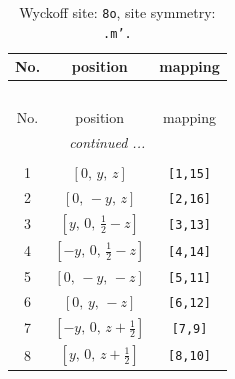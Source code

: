 \documentclass[fleqn,8pt]{jsarticle}
\begin{document}
\renewcommand{\arraystretch}{1.2}
\begin{longtable}{ccc}
\caption{Wyckoff site: {\tt 8o}, site symmetry: {\tt .m'.}}
 \\
 \hline \hline
No. & position & mapping \\ \hline \endfirsthead

\multicolumn{2}{l}{\tablename\ \thetable{}} \\
 \hline \hline
No. & position & mapping \\ \hline \endhead

 \hline \hline
\multicolumn{2}{r}{\footnotesize\it continued ...} \\ \endfoot

 \hline \hline
\multicolumn{2}{r}{} \\ \endlastfoot

1 & $\left[ 0,\, y,\, z \right]$ & {\tt [1,15]} \\ \hline
2 & $\left[ 0,\, - y,\, z \right]$ & {\tt [2,16]} \\ \hline
3 & $\left[ y,\, 0,\, \frac{1}{2} - z \right]$ & {\tt [3,13]} \\ \hline
4 & $\left[ - y,\, 0,\, \frac{1}{2} - z \right]$ & {\tt [4,14]} \\ \hline
5 & $\left[ 0,\, - y,\, - z \right]$ & {\tt [5,11]} \\ \hline
6 & $\left[ 0,\, y,\, - z \right]$ & {\tt [6,12]} \\ \hline
7 & $\left[ - y,\, 0,\, z + \frac{1}{2} \right]$ & {\tt [7,9]} \\ \hline
8 & $\left[ y,\, 0,\, z + \frac{1}{2} \right]$ & {\tt [8,10]} \\
\end{longtable}
\renewcommand{\arraystretch}{1.2}
\end{document}
